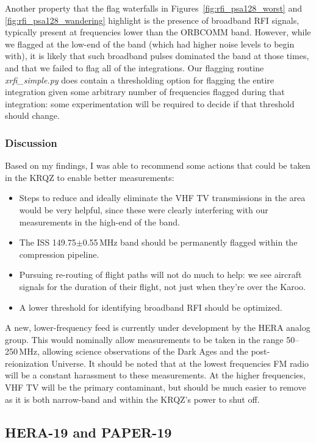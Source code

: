 Another property that the flag waterfalls in Figures~\ref{fig:rfi_psa128_worst} and \ref{fig:rfi_psa128_wandering} highlight is the presence of broadband RFI signals, typically present at frequencies lower than the ORBCOMM band. However, while we flagged at the low-end of the band (which had higher noise levels to begin with), it is likely that such broadband pulses dominated the band at those times, and that we failed to flag all of the integrations. Our flagging routine \textit{xrfi\_simple.py} does contain a thresholding option for flagging the entire integration given some arbitrary number of frequencies flagged during that integration: some experimentation will be required to decide if that threshold should change.

\subsubsection{Discussion}
\label{subsubsec:rfi_paper128_conc}

Based on my findings, I was able to recommend some actions that could be taken in the KRQZ to enable better measurements:
\begin{itemize}
\item  Steps to reduce and ideally eliminate the VHF TV transmissions in the area would be very helpful, since these were clearly interfering with our measurements in the high-end of the band.
\item The ISS 149.75$\pm$0.55\,MHz band should be permanently flagged within the compression pipeline.
\item Pursuing re-routing of flight paths will not do much to help: we see aircraft signals for the duration of their flight, not just when they're over the Karoo.
\item A lower threshold for identifying broadband RFI should be optimized.
\end{itemize}

A new, lower-frequency feed is currently under development by the HERA analog group. This would nominally allow measurements to be taken in the range 50--250\,MHz, allowing science observations of the Dark Ages and the post-reionization Universe. It should be noted that at the lowest frequencies FM radio will be a constant harassment to these measurements. At the higher frequencies, VHF TV will be the primary contaminant, but should be much easier to remove as it is both narrow-band and within the KRQZ's power to shut off.

\subsection{HERA-19 and PAPER-19}
\label{subsec:rfi_hera19paper19}

